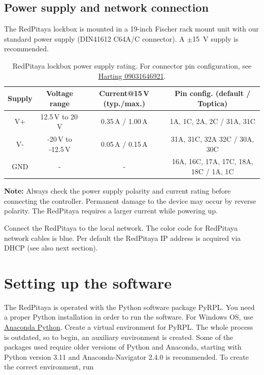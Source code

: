 \documentclass[twoside,a4paper]{refart}
\begin{document}
\subsection{Power supply and network connection}
The RedPitaya lockbox is mounted in a 19-inch Fischer rack mount unit with our standard power supply (DIN41612 C64A/C connector). A $\pm$\SI{15}{\volt} supply is recommended. 

\begin{maxipage}
	\centering
	\begin{table}[H]
		{\small
		\begin{tabular}{|c|c|c|c|}\hline
			\textbf{Supply} & \textbf{Voltage range} & \textbf{Current@15\,V (typ./max.)}	& \textbf{Pin config. (default / Toptica)}  \\\hline
			V+			& 12.5\,V to 20\,V		& 	 0.35\,A / 1.00\,A					& 1A, 1C, 2A, 2C	/  31A, 31C	 \\\hline	
			V-			& -20\,V to -12.5\,V 	&		0.05\,A / 0.15\,A					& 31A, 31C, 32A 32C	/ 30A, 30C\\\hline	 
			GND			& -					&	-										& 16A, 16C, 17A, 17C, 18A, 18C  /  1A, 1C              \\\hline
		\end{tabular}
	}
		\caption{RedPitaya lockbox power supply rating. For connector pin configuration, see \href{https://b2b.harting.com/files/download/PRD/PDF_TS/0903164X921_100072506DRW176A.pdf}{Harting 09031646921}. \label{tab:power}}
	\end{table}
\end{maxipage}

\textbf{Note:} Always check the power supply polarity and current rating before connecting the controller. Permanent damage to the device may occur by reverse polarity. The RedPitaya requires a larger current while powering up.

 Connect the RedPitaya to the local network. The color code for RedPitaya network cables is blue. Per default the RedPitaya IP address is acquired via DHCP (see also next section). 

\section{Setting up the software}

The RedPitaya is operated with the Python software package PyRPL. You need a proper Python installation in order to run the software. For Windows OS, use \href{https://www.anaconda.com/}{Anaconda Python}. Create a virtual environment for PyRPL. The whole process is outdated, so to begin, an auxiliary environment is created. Some of the packages used require older versions of Python and Anaconda, starting with Python version 3.11 and Anaconda-Navigator 2.4.0 is recommended. To create the correct environment, run
\end{document}
